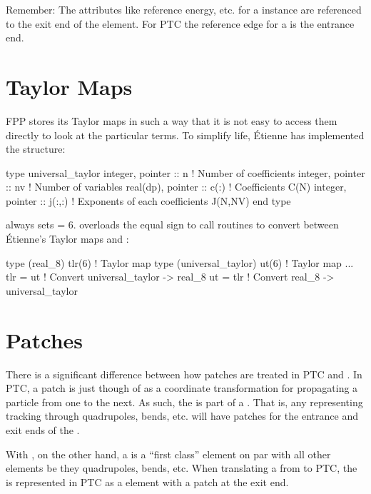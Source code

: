 {{Remember: The attributes like reference energy, etc. for a \bmad
{} instance are referenced to the exit end of the
element. For PTC the reference edge for a  is the entrance
end.

\section{Taylor Maps}
\label{s:ptc.taylor}

FPP stores its  Taylor maps in such a way that it is not
easy to access them directly to look at the particular terms. To
simplify life, \'Etienne has implemented the
structure:
\begin{example}
  type universal_taylor
    integer, pointer  :: n       ! Number of coefficients
    integer, pointer  :: nv      ! Number of variables
    real(dp), pointer :: c(:)    ! Coefficients C(N)
    integer, pointer  :: j(:,:)  ! Exponents of each coefficients J(N,NV)
  end type
\end{example}
\bmad always sets  = 6. \bmad overloads the equal sign to call 
routines to convert between \'Etienne's
 Taylor maps and :
\begin{example}
  type (real_8) tlr(6)           ! Taylor map
  type (universal_taylor) ut(6)  ! Taylor map
  ...
  tlr = ut                       ! Convert universal_taylor -> real_8
  ut = tlr                       ! Convert real_8 -> universal_taylor
\end{example}

\section{Patches}
\label{s:ptc.patch}

There is a significant difference between how patches are treated in
PTC and \bmad.  In PTC, a patch is just though of as a coordinate
transformation for propagating a particle from one  to the
next. As such, the  is part of a . That is, any
 representing tracking through quadrupoles, bends, etc. will
have patches for the entrance and exit ends of the .

With \bmad, on the other hand, a  is a ``first class''
element on par with all other elements be they quadrupoles, bends,
etc. When translating a  from \bmad to PTC, the 
is represented in PTC as a  element with a patch at the
exit end.

}}
